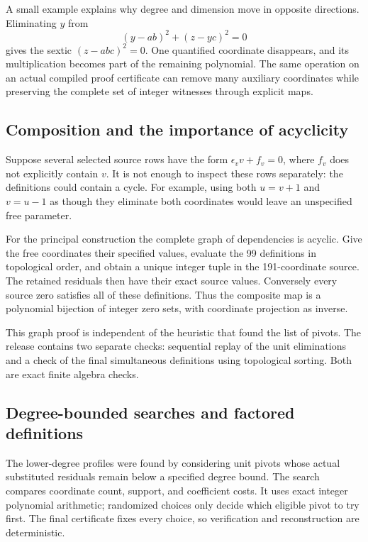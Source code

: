 \documentclass[11pt]{article}
\begin{document}
A small example explains why degree and dimension move in opposite
directions. Eliminating $y$ from
\[
 (y-ab)^2+(z-yc)^2=0
\]
gives the sextic $(z-abc)^2=0$. One quantified coordinate disappears,
and its multiplication becomes part of the remaining polynomial.
The same operation on an actual compiled proof certificate can remove
many auxiliary coordinates while preserving the complete set of integer
witnesses through explicit maps.

\subsection{Composition and the importance of acyclicity}

Suppose several selected source rows have the form
$\epsilon_v v+f_v=0$, where $f_v$ does not explicitly contain $v$.
It is not enough to inspect these rows separately: the definitions
could contain a cycle. For example, using both $u=v+1$ and $v=u-1$
as though they eliminate both coordinates would leave an unspecified
free parameter.

For the principal construction the complete graph of dependencies is
acyclic. Give the free coordinates their specified values, evaluate
the 99 definitions in topological order, and obtain a unique integer
tuple in the 191-coordinate source. The retained residuals then have
their exact source values. Conversely every source zero satisfies all
of these definitions. Thus the composite map is a polynomial bijection
of integer zero sets, with coordinate projection as inverse.

This graph proof is independent of the heuristic that found the list of
pivots. The release contains two separate checks: sequential replay of
the unit eliminations and a check of the final simultaneous definitions
using topological sorting. Both are exact finite algebra checks.

\subsection{Degree-bounded searches and factored definitions}

The lower-degree profiles were found by considering unit pivots whose
actual substituted residuals remain below a specified degree bound.
The search compares coordinate count, support, and coefficient costs.
It uses exact integer polynomial arithmetic; randomized choices only
decide which eligible pivot to try first. The final certificate fixes
every choice, so verification and reconstruction are deterministic.
\end{document}
